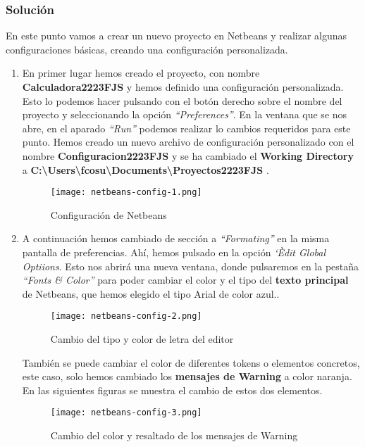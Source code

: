 \subsubsection{Solución}
En este punto vamos a crear un nuevo proyecto en Netbeans y realizar algunas configuraciones básicas, creando una configuración personalizada.

\begin{enumerate}[label=(\alph*)]
    \item En primer lugar hemos creado el proyecto, con nombre \textbf{Calculadora2223FJS} y hemos definido una configuración personalizada. Esto lo podemos hacer pulsando con el botón derecho sobre el nombre del proyecto y seleccionando la opción \textit{``Preferences''}. En la ventana que se nos abre, en el aparado \textit{``Run''} podemos realizar lo cambios requeridos para este punto. Hemos creado un nuevo archivo de configuración personalizado con el nombre \textbf{Configuracion2223FJS} y se ha cambiado el \textbf{Working Directory} a \textbf{C:\textbackslash Users\textbackslash fcosu\textbackslash Documents\textbackslash Proyectos2223FJS }.

    \begin{figure}[ht]
        \centering
        \texttt{[image: netbeans-config-1.png]}
        \caption{Configuración de Netbeans}
    \end{figure}

    \item A continuación hemos cambiado de sección a \textit{``Formating''} en la misma pantalla de preferencias. Ahí, hemos pulsado en la opción \textit{`Èdit Global Optiions}. Esto nos abrirá una nueva ventana, donde pulsaremos en la pestaña \textit{``Fonts \& Color''} para poder cambiar el color y el tipo del \textbf{texto principal} de Netbeans, que hemos elegido el tipo Arial de color azul..

     \begin{figure}[ht]
        \centering
        \texttt{[image: netbeans-config-2.png]}
        \caption{Cambio del tipo y color de letra del editor}
    \end{figure}

     También se puede cambiar el color de diferentes tokens o elementos concretos, este caso, solo hemos cambiado los \textbf{mensajes de Warning} a color naranja. En las siguientes figuras se muestra el cambio de estos dos elementos.

   \begin{figure}[ht]
       \centering
       \texttt{[image: netbeans-config-3.png]}
       \caption{Cambio del color y resaltado de los mensajes de Warning}
    \end{figure}
\end{enumerate}

